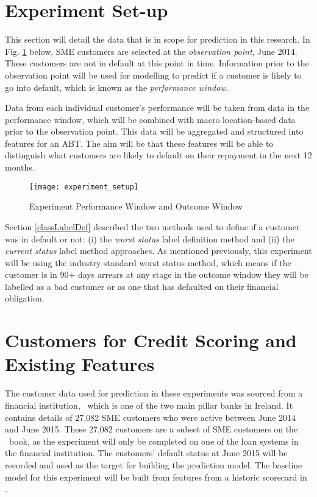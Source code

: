 \section{Experiment Set-up}
This section will detail the data that is in scope for prediction in this research. In Fig. \ref{fig:experiment_setup1} below, SME customers are selected at the \textit{observation point}, June 2014. These customers are not in default at this point in time. Information prior to the observation point will be used for modelling to predict if a customer is likely to go into default, which is known as the \textit{performance window}.

Data from each individual customer's performance will be taken from data in the performance window, which will be combined with macro location-based data prior to the observation point. This data will be aggregated and structured into features for an ABT. The aim will be that these features will be able to distinguish what customers are likely to default on their repayment in the next 12 months. 

\begin{figure}[H]
	\texttt{[image: experiment\_setup]}
	\caption[Experiment Performance Window and Outcome Window]
	{Experiment Performance Window and Outcome Window}
	\label{fig:experiment_setup1}
\end{figure}

Section \ref{classLabelDef} described the two methods used to define if a customer was in default or not: (i) the \textit{worst status} label definition method and (ii) the \textit{current status} label method approaches. As mentioned previously, this experiment will be using the industry standard worst status method, which means if the customer is in 90+ days arrears at any stage in the outcome window they will be labelled as a bad customer or as one that has defaulted on their financial obligation. 


\section{Customers for Credit Scoring and Existing Features}\label{sec:existFeatures}

The customer data used for prediction in these experiments was sourced from a financial institution, \subjectname\, which is one of the two main pillar banks in Ireland. It contains details of 27,082 SME customers who were active between June 2014 and June 2015. These 27,082 customers are a subset of SME customers on the \subjectname\ book, as the experiment will only be completed on one of the loan systems in the financial institution. The customers' default status at June 2015 will be recorded and used as the target for building the prediction model. The baseline model for this experiment will be built from features from a historic scorecard in \subjectname.

